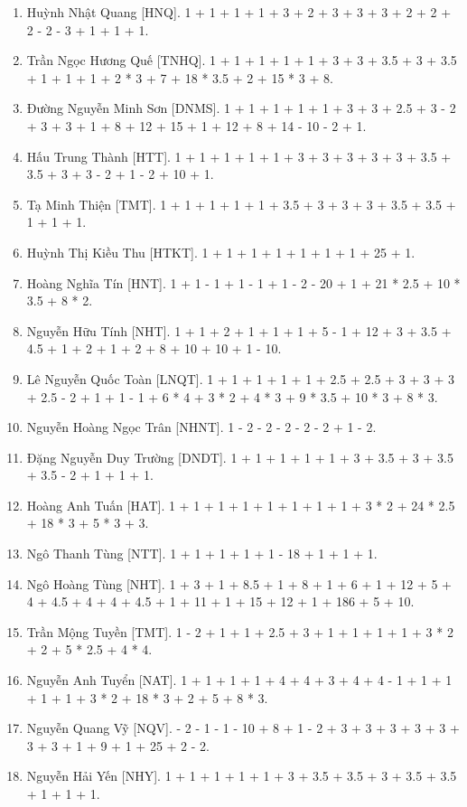 \documentclass{article}
\begin{document}
\begin{enumerate}
	\item {\sc Huỳnh Nhật Quang [HNQ].} 1 + 1 + 1 + 1 +	3 + 2 + 3 + 3 + 3 + 2 + 2 + 2 - 2 - 3 + 1 + 1 + 1.
	\item {\sc Trần Ngọc Hương Quế [TNHQ].} 1 + 1 + 1 + 1 + 1 + 3 + 3 + 3.5 + 3 + 3.5 + 1 + 1 + 1 + 2 * 3 + 7 + 18 * 3.5 + 2 + 15 * 3 + 8.
	\item {\sc Đường Nguyễn Minh Sơn [DNMS].} 1 + 1 + 1 + 1 + 1 + 3 + 3 + 2.5 + 3 - 2 + 3 + 3 + 1 + 8 + 12 + 15 + 1 + 12 + 8 + 14 - 10 - 2 + 1.
	\item {\sc Hấu Trung Thành [HTT].} 1 + 1 + 1 + 1 + 1 + 3 + 3 + 3 + 3 + 3 + 3.5 + 3.5 + 3 + 3 - 2 + 1 - 2 + 10 + 1.
	\item {\sc Tạ Minh Thiện [TMT].} 1 + 1 + 1 + 1 + 1 + 3.5 + 3 + 3 + 3 + 3.5 + 3.5 + 1 + 1 + 1.
	\item {\sc Huỳnh Thị Kiều Thu [HTKT].} 1 + 1 + 1 + 1 + 1 + 1 + 1 + 25 + 1.
	\item {\sc Hoàng Nghĩa Tín [HNT].} 1 + 1 - 1 + 1 - 1 + 1 - 2 - 20 + 1 + 21 * 2.5 + 10 * 3.5 + 8 * 2.
	\item {\sc Nguyễn Hữu Tính [NHT].} 1 + 1 + 2 + 1 + 1 + 1 + 5 - 1 + 12 + 3 + 3.5 + 4.5 + 1 + 2 + 1 + 2 + 8 + 10 + 10 + 1 - 10.
	\item {\sc Lê Nguyễn Quốc Toàn [LNQT].} 1 + 1 + 1 + 1 + 1 + 2.5 + 2.5 + 3 + 3 + 3 + 2.5 - 2 + 1 + 1 - 1 + 6 * 4 + 3 * 2 + 4 * 3 + 9 * 3.5 + 10 * 3 + 8 * 3.
	\item {\sc Nguyễn Hoàng Ngọc Trân [NHNT].} 1 - 2 - 2 - 2 - 2 - 2 + 1 - 2.
	\item {\sc Đặng Nguyễn Duy Trường [DNDT].} 1 + 1 + 1 + 1 + 1 + 3 + 3.5 + 3 + 3.5 + 3.5 - 2 + 1 + 1 + 1.
	\item {\sc Hoàng Anh Tuấn [HAT].} 1 + 1 + 1 + 1 + 1 + 1 + 1 + 1 + 3 * 2 + 24 * 2.5 + 18 * 3 + 5 * 3 + 3.
	\item {\sc Ngô Thanh Tùng [NTT].} 1 + 1 + 1 + 1 + 1 - 18 + 1 + 1 + 1.
	\item {\sc Ngô Hoàng Tùng [NHT].} 1 + 3 + 1 + 8.5 + 1 + 8 + 1 + 6 + 1 + 12 + 5 + 4 + 4.5 + 4 + 4 + 4.5 + 1 + 11 + 1 + 15 + 12 + 1 + 186 + 5 + 10.
	\item {\sc Trần Mộng Tuyền [TMT].} 1 - 2 + 1 + 1 + 2.5 + 3 + 1 + 1 + 1 + 1 + 3 * 2 + 2 + 5 * 2.5 + 4 * 4.
	\item {\sc Nguyễn Anh Tuyển [NAT].} 1 + 1 + 1 + 1 + 4 + 4 + 3 + 4 + 4 - 1 + 1 + 1 + 1 + 1 + 3 * 2 + 18 * 3 + 2 + 5 + 8 * 3.
	\item {\sc Nguyễn Quang Vỹ [NQV].} - 2 - 1 - 1 - 10 + 8 + 1 - 2 + 3 + 3 + 3 + 3 + 3 + 3 + 3 + 1 + 9 + 1 + 25 + 2 - 2.
	\item {\sc Nguyễn Hải Yến [NHY].} 1 + 1 + 1 + 1 + 1 + 3 + 3.5 + 3.5 + 3 + 3.5 + 3.5 + 1 + 1 + 1.
\end{enumerate}
\end{document}
